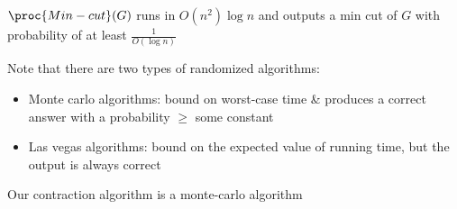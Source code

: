 \documentclass[../notes.tex]{subfiles}
\begin{document}
\begin{theorem}
  $ \proc{Min-cut}(G) $ runs in $ O(n^2) \log n $ and outputs a min cut of $ G $ with probability of at least $ \frac{1}{O(\log n)} $ 
\end{theorem}








\begin{blockquote}
  Note that there are two types of randomized algorithms:
  \begin{itemize}
    \item Monte carlo algorithms: bound on worst-case time \& produces a correct answer with a probability $ \ge  $ some constant
    \item Las vegas algorithms: bound on the expected value of running time, but the output is always correct
  \end{itemize}

  Our contraction algorithm is a monte-carlo algorithm
\end{blockquote}
\end{document}
